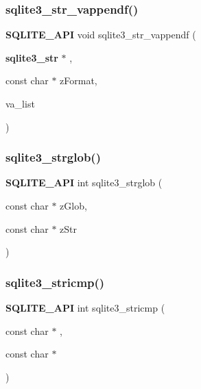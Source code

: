 \mbox{\label{sqlite3_8h_a0bf366481db203ddb34191b3b613bffb}} 
\subsubsection{sqlite3\_str\_vappendf()}
{\footnotesize\ttfamily \textbf{ S\+Q\+L\+I\+T\+E\+\_\+\+A\+PI} void sqlite3\+\_\+str\+\_\+vappendf (\begin{DoxyParamCaption}\item[{\textbf{ sqlite3\+\_\+str} $\ast$}]{,  }\item[{const char $\ast$}]{z\+Format,  }\item[{va\+\_\+list}]{ }\end{DoxyParamCaption})}

\mbox{\label{sqlite3_8h_a15e4bdff3e3cd06c68de326d03f4aa37}} 
\subsubsection{sqlite3\_strglob()}
{\footnotesize\ttfamily \textbf{ S\+Q\+L\+I\+T\+E\+\_\+\+A\+PI} int sqlite3\+\_\+strglob (\begin{DoxyParamCaption}\item[{const char $\ast$}]{z\+Glob,  }\item[{const char $\ast$}]{z\+Str }\end{DoxyParamCaption})}

\mbox{\label{sqlite3_8h_aaa53981a07ebaa0c9d16b24032fb943c}} 
\subsubsection{sqlite3\_stricmp()}
{\footnotesize\ttfamily \textbf{ S\+Q\+L\+I\+T\+E\+\_\+\+A\+PI} int sqlite3\+\_\+stricmp (\begin{DoxyParamCaption}\item[{const char $\ast$}]{,  }\item[{const char $\ast$}]{ }\end{DoxyParamCaption})}

\mbox{\label{sqlite3_8h_a2b35dcf90a1db4d8feb74101a588af8a}} 
